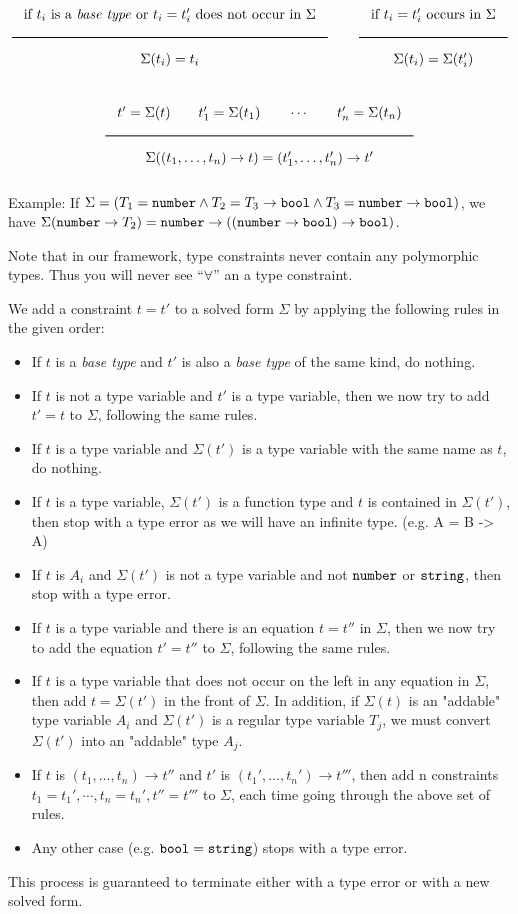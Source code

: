 \[
  \Rule{\textrm{if $t_i$ is a \emph{base type} or }t_i = t_i'\textrm{ does not occur in }\Sigma}{
    \Sigma(t_i) = t_i}
  \qquad
  \Rule{\textrm{if }t_i = t_i'\textrm{ occurs in }\Sigma}{
    \Sigma(t_i) = \Sigma(t_i')}  
\]

\[
  \Rule{t' = \Sigma(t) \qquad t_1' = \Sigma(t_1) \qquad \cdots \qquad t_n' = \Sigma(t_n) }{
  \Sigma((t_1, \ldots, t_n) \rightarrow t) = (t_1', \ldots, t_n') \rightarrow t'}
\]

\noindent
Example: If $\Sigma = (T_1 = \texttt{number} \wedge T_2 = T_3 \rightarrow \texttt{bool} \wedge T_3 = \texttt{number}
\rightarrow \texttt{bool})$, we have $\Sigma(\texttt{number} \rightarrow T_2) = \texttt{number} \rightarrow ((\texttt{number}
\rightarrow \texttt{bool}) \rightarrow \texttt{bool})$.

Note that in our framework, type constraints never contain any polymorphic types. Thus
you will never see ``$\forall$'' an a type constraint.

We add a constraint $t = t'$ to a solved form $\Sigma$ by applying the following rules
in the given order:
\begin{itemize}
\item If $t$ is a \emph{base type} and $t'$ is also a \emph{base type} of the same kind, do nothing.
\item If $t$ is not a type variable and $t'$ is a type variable, then we now try to add $t' = t$ to
$\Sigma$, following the same rules.
\item If $t$ is a type variable and $\Sigma(t')$ is a type variable with the same name as $t$, do nothing.
\item If $t$ is a type variable, $\Sigma(t')$ is a function type and $t$ is contained in $\Sigma(t')$, then stop
  with a type error as we will have an infinite type. (e.g. A = B -> A)
\item If $t$ is $A_i$ and $\Sigma(t')$ is not a type variable and not $\texttt{number}$ or $\texttt{string}$,
  then stop with a type error.
\item If $t$ is a type variable and there is an equation $t = t''$ in $\Sigma$, then
  we now try to add the equation $t' = t''$ to $\Sigma$, following the same rules.
\item If $t$ is a type variable that does not occur on the left in any equation in $\Sigma$,
  then add $t = \Sigma(t')$ in the front of $\Sigma$. In addition, if $\Sigma(t)$ is an "addable"
  type variable $A_i$ and $\Sigma(t')$ is a regular type variable $T_j$, we must convert $\Sigma(t')$
  into an "addable" type $A_j$.  
\item If $t$ is $(t_1,\ldots, t_n) \rightarrow t''$ and
  $t'$ is $(t_1',\ldots, t_n') \rightarrow t'''$, then add n constraints
  $t_1 = t_1', \cdots, t_n = t_n', t'' = t'''$ to $\Sigma$, each time going through the above set of rules.
\item Any other case  (e.g. $\texttt{bool} = \texttt{string}$) stops with a type error.
\end{itemize}
This process is guaranteed to terminate either with a type error or with a new solved form.

